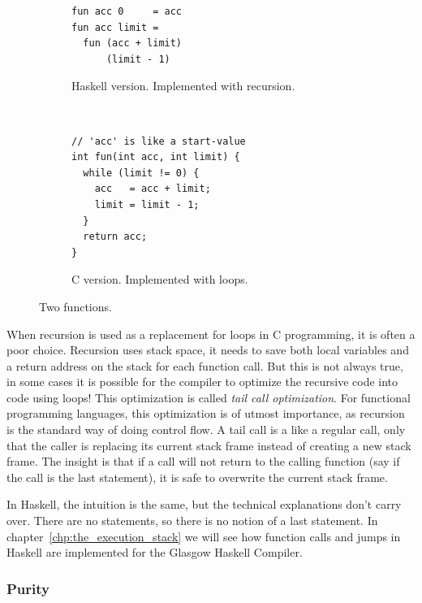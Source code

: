 \begin{figure}
\begin{mdframed}
        \begin{subfigure}[t]{0.5\textwidth}
            \begin{verbatim}
fun acc 0     = acc
fun acc limit =
  fun (acc + limit)
      (limit - 1)
            \end{verbatim}
            \caption{Haskell version. Implemented with recursion.}
        \end{subfigure}
        ~ %
        \begin{subfigure}[t]{0.5\textwidth}
          \begin{verbatim}
// 'acc' is like a start-value
int fun(int acc, int limit) {
  while (limit != 0) {
    acc   = acc + limit;
    limit = limit - 1;
  }
  return acc;
}
          \end{verbatim}
          \caption{C version. Implemented with loops.}
        \end{subfigure}
        \caption{Two functions.}\label{fig:tail_call_fun}
\end{mdframed}
\end{figure}

When recursion is used as a replacement for loops in C programming, it
is often a poor choice. Recursion uses stack space,
it needs to save both local variables and a return address on the stack
for each function call. But this is not always true, in some cases it
is possible for the compiler to optimize the recursive code into code
using loops! This optimization is called \emph{tail call optimization}.
For functional programming languages, this optimization is of utmost
importance, as recursion is the standard way of doing control flow.
A tail call is a like a regular call, only that the caller is
replacing its current stack frame instead of creating a new stack frame.
The insight is that if a call will not return to the calling function (say
if the call is the last statement), it is safe to overwrite the current
stack frame.

In Haskell, the intuition is the same, but the technical explanations
don't carry over. There are no statements, so there is no notion of a
last statement. In chapter~\ref{chp:the_execution_stack} we will see how
function calls and jumps in Haskell are implemented for the Glasgow
Haskell Compiler.

\subsubsection{Purity}

